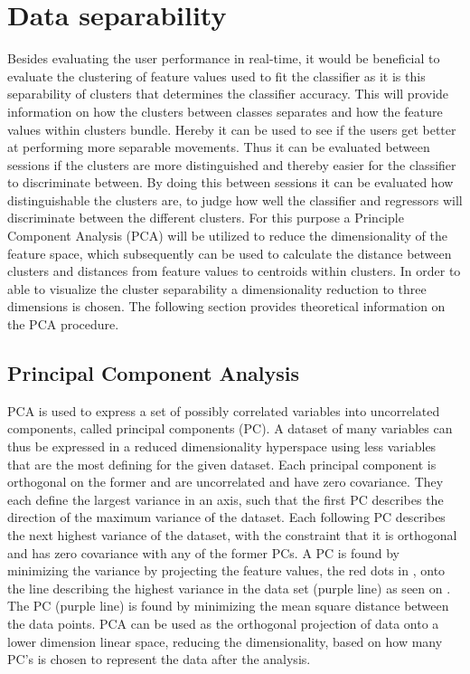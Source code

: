 \section{Data separability} \label{sec:BG:dataSeparability}
Besides evaluating the user performance in real-time, it would be beneficial to evaluate the clustering of feature values used to fit the classifier as it is this separability of clusters that determines the classifier accuracy. This will provide information on how the clusters between classes separates and how the feature values within clusters bundle. Hereby it can be used to see if the users get better at performing more separable movements. Thus it can be evaluated between sessions if the clusters are more distinguished and thereby easier for the classifier to discriminate between. 
By doing this between sessions it can be evaluated how distinguishable the clusters are, to judge how well the classifier and regressors will discriminate between the different clusters. For this purpose a Principle Component Analysis (PCA) will be utilized to reduce the dimensionality of the feature space, which subsequently can be used to calculate the distance between clusters and distances from feature values to centroids within clusters. In order to able to visualize the cluster separability a dimensionality reduction to three dimensions is chosen. The following section provides theoretical information on the PCA procedure. 


\subsection{Principal Component Analysis} \label{sub:BG:PCA}
PCA is used to express a set of possibly correlated variables into uncorrelated components, called principal components (PC). A dataset of many variables can thus be expressed in a reduced dimensionality hyperspace using less variables that are the most defining for the given dataset. Each principal component is orthogonal on the former and are uncorrelated and have zero covariance. They each define the largest variance in an axis, such that the first PC describes the direction of the maximum variance of the dataset. Each following PC describes the next highest variance of the dataset, with the constraint that it is orthogonal and has zero covariance with any of the former PCs. \cite{Semmlow2014}
A PC is found by minimizing the variance by projecting the feature values, the red dots in , onto the line describing the highest variance in the data set (purple line) as seen on . The PC (purple line) is found by minimizing the mean square distance between the data points. PCA can be used as the orthogonal projection of data onto a lower dimension linear space, reducing the dimensionality, based on how many PC's is chosen to represent the data after the analysis. \cite{Semmlow2014}

